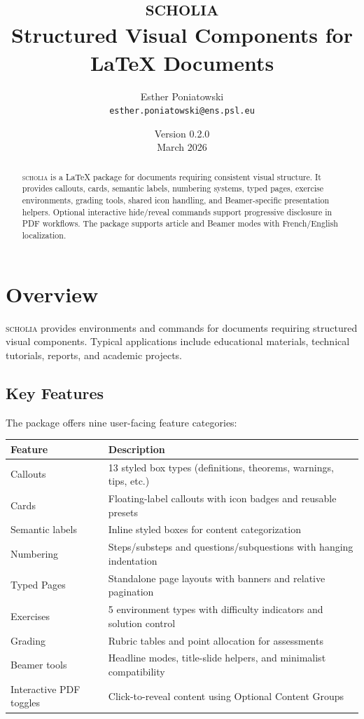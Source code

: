 \documentclass[11pt,a4paper]{article}
\title{\Huge\bfseries\textsc{scholia}\\[0.5em]
  \Large Structured Visual Components for \LaTeX{} Documents}
\author{Esther Poniatowski\\
  \texttt{esther.poniatowski@ens.psl.eu}}
\date{Version 0.2.0\\March 2026}
\newcommand{\scholia}{\textsc{scholia}\xspace}
\begin{document}
\maketitle

\begin{abstract}
\scholia is a \LaTeX{} package for documents requiring consistent visual structure.
It provides callouts, cards, semantic labels, numbering systems, typed pages,
exercise environments, grading tools, shared icon handling, and Beamer-specific
presentation helpers. Optional interactive hide/reveal commands support
progressive disclosure in PDF workflows. The package supports article and
Beamer modes with French/English localization.
\end{abstract}

\tableofcontents
\newpage

\section{Overview}

\scholia provides environments and commands for documents requiring structured
visual components. Typical applications include educational materials, technical
tutorials, reports, and academic projects.

\subsection{Key Features}

The package offers nine user-facing feature categories:

\begin{tabular}{@{}lp{9cm}@{}}
\toprule
\textbf{Feature} & \textbf{Description} \\
\midrule
Callouts & 13 styled box types (definitions, theorems, warnings, tips, etc.) \\
Cards & Floating-label callouts with icon badges and reusable presets \\
Semantic labels & Inline styled boxes for content categorization \\
Numbering & Steps/substeps and questions/subquestions with hanging indentation \\
Typed Pages & Standalone page layouts with banners and relative pagination \\
Exercises & 5 environment types with difficulty indicators and solution control \\
Grading & Rubric tables and point allocation for assessments \\
Beamer tools & Headline modes, title-slide helpers, and minimalist compatibility \\
Interactive PDF toggles & Click-to-reveal content using Optional Content Groups \\
\bottomrule
\end{tabular}
\end{document}
